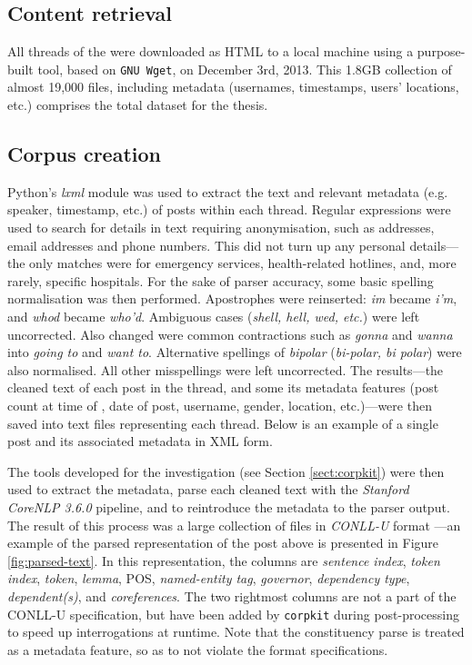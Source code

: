 \subsection{Content retrieval}

All \glspl{thread} of the  were downloaded as \gls{HTML} to a local machine using a purpose\hyp{}built tool, based on \texttt{GNU Wget}, on December 3rd, 2013. This 1.8GB collection of almost 19,000 files, including metadata (usernames, timestamps, users' locations, etc.) comprises the total dataset for the thesis.

\subsection{Corpus creation}

Python's \emph{lxml} module was used to extract the text and relevant metadata (e.g. speaker, timestamp, etc.) of \glspl{post} within each \gls{thread}. Regular expressions were used to search for details in text requiring anonymisation, such as addresses, email addresses and phone numbers. This did not turn up any personal details---the only matches were for emergency services, health\hyp{}related hotlines, and, more rarely, specific hospitals. For the sake of parser accuracy, some basic spelling normalisation was then performed. Apostrophes were reinserted: \emph{im} became \emph{i'm}, and \emph{whod} became \emph{who'd}. Ambiguous cases (\emph{shell, hell, wed, etc.}) were left uncorrected. Also changed were common contractions such as \emph{gonna} and \emph{wanna} into \emph{going to} and \emph{want to}. Alternative spellings of \emph{bipolar} (\emph{bi-polar, bi polar}) were also normalised. All other misspellings were left uncorrected. The results---the cleaned text of each post in the thread, and some its metadata features (\gls{post} count at time of , date of \gls{post}, username, gender, location, etc.)---were then saved into text files representing each \gls{thread}. Below is an example of a single \gls{post} and its associated metadata in \gls{XML} form.


%
\noindent The tools developed for the investigation (see Section \ref{sect:corpkit}) were then used to extract the metadata, parse each cleaned text with the \emph{Stanford CoreNLP 3.6.0} pipeline, and to reintroduce the metadata to the parser output. The result of this process was a large collection of files in \emph{CONLL\hyp{}U} format \cite{nivre_towards_2015}---an example of the parsed representation of the \gls{post} above is presented in Figure \ref{fig:parsed-text}. In this representation, the columns are \emph{sentence index}, \emph{token index}, \emph{token}, \emph{lemma}, \gls{POS}, \emph{named\hyp{}entity tag}, \emph{governor}, \emph{dependency type}, \emph{dependent(s)}, and \emph{coreferences}. The two rightmost columns are not a part of the CONLL\hyp{}U specification, but have been added by \texttt{corpkit} during post\hyp{}processing to speed up interrogations at runtime. Note that the constituency parse is treated as a metadata feature, so as to not violate the format specifications.

